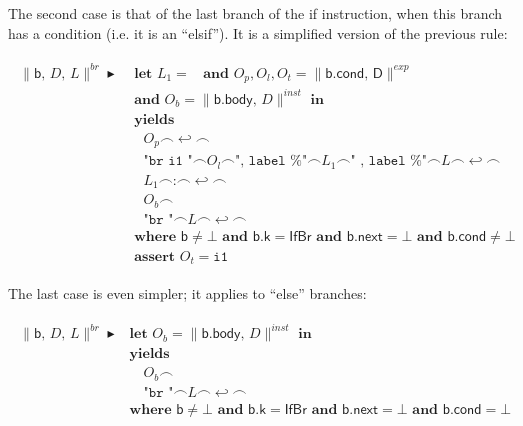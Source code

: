 \documentclass{article}
\newcommand{\trad}[2]{\ensuremath{\lVert \textsf{#1} \rVert^{\textit{#2}}}}
\newcommand{\nl}[0]{\ensuremath{\hookleftarrow}}
\DeclareMathOperator{\conc}{\smallfrown}
\DeclareMathOperator{\isdef}{\blacktriangleright}
\DeclareMathOperator{\name}{\mathcal{L}()}
\begin{document}
The second case is that of the last branch of the if instruction, when
this branch has a condition (i.e. it is an ``elsif''). It is a simplified
version of the previous rule:
\begin{framed}
\begin{align}
\begin{split}
  \trad{b, $D$, $L$}{br} \isdef 
  & \textbf{ let } L_1 = \name \textbf{ and } O_p, O_l, O_t = \trad{b.cond, D}{exp}  \\
  & \textbf{ and } O_b = \trad{b.body, $D$}{inst} \textbf{ in} \\
  & \textbf{ yields }  \\
  & \quad O_p \conc \nl \conc  \\
  & \quad \texttt{"br i1 "} \conc O_l \conc \texttt{", label \%"} \conc L_1 \conc \texttt{" , label \%"} \conc L \conc \nl \conc  \\
  & \quad L_1 \conc \texttt{:} \conc \nl \conc  \\
  & \quad O_b \conc  \\
  & \quad \texttt{"br "} \conc L \conc \nl \conc  \\
  & \textbf{ where } \textsf{b} \ne \bot \textbf{ and } \textsf{b.k} = \textsf{IfBr} \textbf{ and } \textsf{b.next} = \bot  \textbf{ and } \textsf{b.cond} \ne \bot  \\
  & \textbf{ assert } O_t = \texttt{i1} 
\end{split}
\end{align}
\end{framed}

The last case is even simpler; it applies to ``else'' branches:
\begin{framed}
\begin{align}
\begin{split}
  \trad{b, $D$, $L$}{br} \isdef 
  & \textbf{let } O_b = \trad{b.body, $D$}{inst} \textbf{ in} \\
  & \textbf{yields }  \\
  & \quad O_b \conc  \\
  & \quad \texttt{"br "} \conc L \conc \nl \conc  \\
  & \textbf{where } \textsf{b} \ne \bot \textbf{ and } \textsf{b.k} = \textsf{IfBr} \textbf{ and } \textsf{b.next} = \bot  \textbf{ and } \textsf{b.cond} = \bot 
\end{split}
\end{align}
\end{framed}
\end{document}
